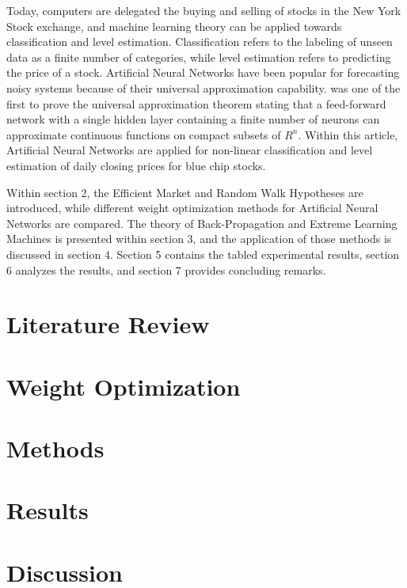 \documentclass{ncjms}
\begin{document}
	Today, computers are delegated the buying and selling of stocks in the New York Stock exchange, and machine learning theory can be applied towards classification and level estimation.
	Classification refers to the labeling of unseen data as a finite number of categories, while level estimation refers to predicting the price of a stock.
	Artificial Neural Networks have been popular for forecasting noisy systems because of their universal approximation capability.
	\citet{Cybenko:1989} was one of the first to prove the universal approximation theorem stating that a feed-forward network with a single hidden layer containing a finite number of neurons can approximate continuous functions on compact subsets of $R^n$.
	Within this article, Artificial Neural Networks are applied for non-linear classification and level estimation of daily closing prices for blue chip stocks.

	Within section 2, the Efficient Market and Random Walk Hypotheses are introduced, while different weight optimization methods for Artificial Neural Networks are compared.
	The theory of Back-Propagation and Extreme Learning Machines is presented within section 3, and the application of those methods is discussed in section 4.
	Section 5 contains the tabled experimental results, section 6 analyzes the results, and section 7 provides concluding remarks.

	\section{Literature Review}\label{sec:literature-review}
	

	\section{Weight Optimization}\label{sec:weight-optimization}
	

	\section{Methods}\label{sec:methods}
	

	\section{Results}\label{sec:results}
	

	\section{Discussion}\label{sec:discussion}
	
\end{document}
